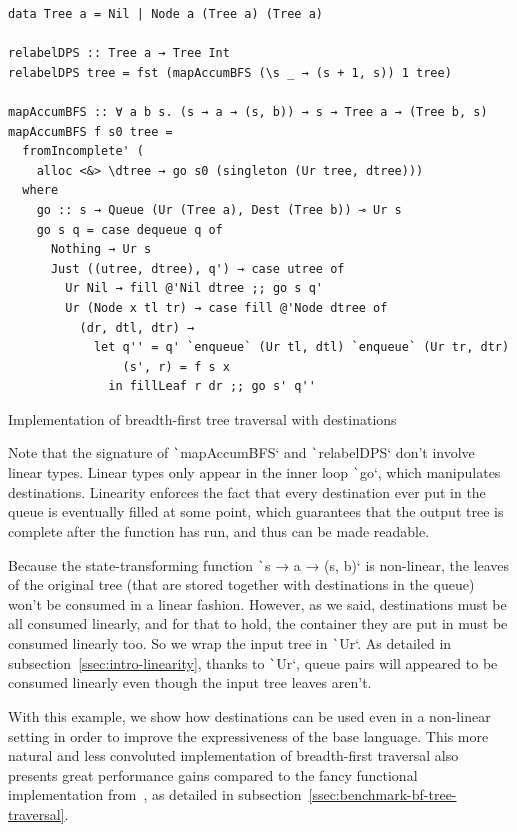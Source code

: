\documentclass[english]{jflart}
\begin{document}
\begin{table}[t]
\small
\begin{verbatim}
data Tree a = Nil | Node a (Tree a) (Tree a)

relabelDPS :: Tree a → Tree Int
relabelDPS tree = fst (mapAccumBFS (\s _ → (s + 1, s)) 1 tree)

mapAccumBFS :: ∀ a b s. (s → a → (s, b)) → s → Tree a → (Tree b, s)
mapAccumBFS f s0 tree =
  fromIncomplete' (
    alloc <&> \dtree → go s0 (singleton (Ur tree, dtree)))
  where
    go :: s → Queue (Ur (Tree a), Dest (Tree b)) ⊸ Ur s
    go s q = case dequeue q of
      Nothing → Ur s
      Just ((utree, dtree), q') → case utree of
        Ur Nil → fill @'Nil dtree ;; go s q'
        Ur (Node x tl tr) → case fill @'Node dtree of
          (dr, dtl, dtr) →
            let q'' = q' `enqueue` (Ur tl, dtl) `enqueue` (Ur tr, dtr)
                (s', r) = f s x
              in fillLeaf r dr ;; go s' q''
\end{verbatim}
\caption{Implementation of breadth-first tree traversal with destinations}
\label{table:impl-bfs-tree-traversal}
\end{table}

Note that the signature of \texttt`mapAccumBFS` and \texttt`relabelDPS` don't involve linear types. Linear types only appear in the inner loop \texttt`go`, which manipulates destinations. Linearity enforces the fact that every destination ever put in the queue is eventually filled at some point, which guarantees that the output tree is complete after the function has run, and thus can be made readable.

Because the state-transforming function \texttt`s → a → (s, b)` is non-linear, the leaves of the original tree (that are stored together with destinations in the queue) won't be consumed in a linear fashion. However, as we said, destinations must be all consumed linearly, and for that to hold, the container they are put in must be consumed linearly too. So we wrap the input tree in \texttt`Ur`. As detailed in subsection~\ref{ssec:intro-linearity}, thanks to \texttt`Ur`, queue pairs will appeared to be consumed linearly even though the input tree leaves aren't.

With this example, we show how destinations can be used even in a non-linear setting in order to improve the expressiveness of the base language. This more natural and less convoluted implementation of breadth-first traversal also presents great performance gains compared to the fancy functional implementation from~\cite{gibbons_phases_2023}, as detailed in subsection~\ref{ssec:benchmark-bf-tree-traversal}.
\end{document}

